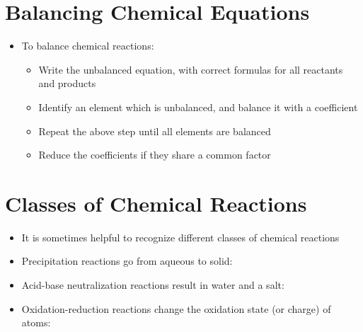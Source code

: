 \documentclass[12pt, openany, letterpaper]{memoir}
\begin{document}
\section{Balancing Chemical Equations}
\begin{itemize}
	\item To balance chemical reactions:
	\begin{itemize}
		\item Write the unbalanced equation, with correct formulas for all reactants and products
		\item Identify an element which is unbalanced, and balance it with a coefficient
		\item Repeat the above step until all elements are balanced
		\item Reduce the coefficients if they share a common factor
	\end{itemize}
\end{itemize}
\section{Classes of Chemical Reactions}
\begin{itemize}
	\item It is sometimes helpful to recognize different classes of chemical reactions
	\item Precipitation reactions go from aqueous to solid: 
	
	\item Acid-base neutralization reactions result in water and a salt:
	
	\item Oxidation-reduction reactions change the oxidation state (or charge) of atoms:
	
\end{itemize}
\end{document}

